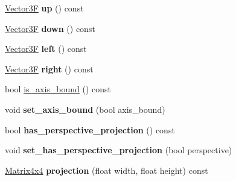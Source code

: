 \begin{DoxyCompactItemize}
\mbox{\hyperlink{class_vector3}{Vector3F}} {\bfseries up} () const
\item 
\mbox{\label{class_camera_aac84f1893c5e9d6fba4b808d28a76560}} 
\mbox{\hyperlink{class_vector3}{Vector3F}} {\bfseries down} () const
\item 
\mbox{\label{class_camera_a5321fe15cd196021eea531de71f41e14}} 
\mbox{\hyperlink{class_vector3}{Vector3F}} {\bfseries left} () const
\item 
\mbox{\label{class_camera_a04a615c03274f5a4c7af4164032b24e8}} 
\mbox{\hyperlink{class_vector3}{Vector3F}} {\bfseries right} () const
\item 
bool \mbox{\hyperlink{class_camera_a2c0432bd7e7e47d0e90d0fdf7d99a798}{is\+\_\+axis\+\_\+bound}} () const
\item 
\mbox{\label{class_camera_a9f003408eb5324f88cca52221d825c8b}} 
void {\bfseries set\+\_\+axis\+\_\+bound} (bool axis\+\_\+bound)
\item 
\mbox{\label{class_camera_a0faf690094effa7365ada339b6cb1751}} 
bool {\bfseries has\+\_\+perspective\+\_\+projection} () const
\item 
\mbox{\label{class_camera_af88ca0b5be539ddf342dbdd0e2fb0f78}} 
void {\bfseries set\+\_\+has\+\_\+perspective\+\_\+projection} (bool perspective)
\item 
\mbox{\label{class_camera_a97d7719189209c7f3976e838bf2bd6a7}} 
\mbox{\hyperlink{class_matrix4x4}{Matrix4x4}} {\bfseries projection} (float width, float height) const
\end{DoxyCompactItemize}
